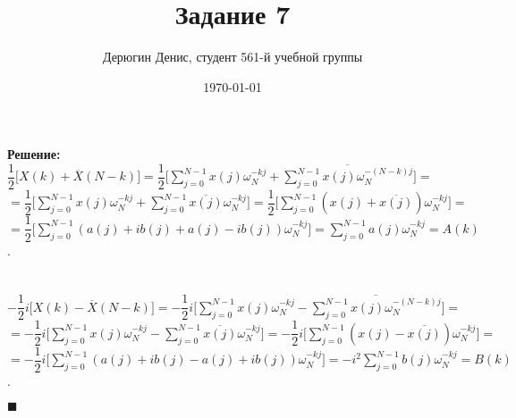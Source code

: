 \documentclass{article}
\title{Задание 7}
\author{
	Дерюгин Денис, студент 561-й учебной группы
}
\date{\today}
\newcommand\proofend{\begin{flushright}$\blacksquare$\end{flushright}}
\begin{document}
\maketitle
\large{
	\textbf{Решение:} \\
	$\dfrac{1}{2} \big [ X(k) + \overline{X}(N - k) \big ] = \dfrac{1}{2} \big [ \sum\limits_{j = 0}^{N - 1} x(j) \omega_N^{-kj} + \overline{\sum\limits_{j = 0}^{N - 1} x(j) \omega_N^{-(N - k)j}}\big ] = $\\
	$= \dfrac{1}{2} \big [ \sum\limits_{j = 0}^{N - 1} x(j) \omega_N^{-kj} + \sum\limits_{j = 0}^{N - 1} \overline{x(j)} \omega_N^{-kj}\big ] = \dfrac{1}{2} \big [ \sum\limits_{j = 0}^{N - 1} (x(j) + \overline{x(j)}) \omega_N^{-kj}\big ] =$\\
	$= \dfrac{1}{2} \big [ \sum\limits_{j = 0}^{N - 1} (a(j) + ib(j) + a(j) - ib(j)) \omega_N^{-kj}\big ] = \sum\limits_{j = 0}^{N - 1} a(j) \omega_N^{-kj} = A(k)$.\\ \\ \\



	$-\dfrac{1}{2} i\big [ X(k) - \overline{X}(N - k) \big ] = -\dfrac{1}{2}i \big [ \sum\limits_{j = 0}^{N - 1} x(j) \omega_N^{-kj} - \overline{\sum\limits_{j = 0}^{N - 1} x(j) \omega_N^{-(N - k)j}}\big ] = $\\
	$= -\dfrac{1}{2} i\big [ \sum\limits_{j = 0}^{N - 1} x(j) \omega_N^{-kj} - \sum\limits_{j = 0}^{N - 1} \overline{x(j)} \omega_N^{-kj}\big ] = -\dfrac{1}{2}i \big [ \sum\limits_{j = 0}^{N - 1} (x(j) - \overline{x(j)}) \omega_N^{-kj}\big ] = $ \\
	$= -\dfrac{1}{2}i \big [ \sum\limits_{j = 0}^{N - 1} (a(j) + ib(j) - a(j) + ib(j)) \omega_N^{-kj}\big ] = -i^2\sum\limits_{j = 0}^{N - 1} b(j) \omega_N^{-kj} = B(k)$.



	\proofend
}
\end{document}
